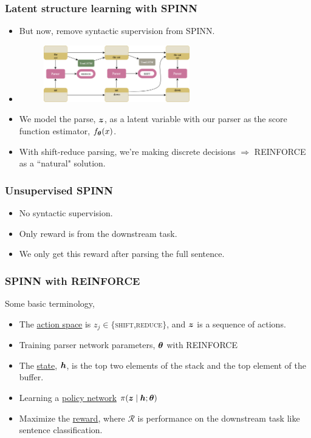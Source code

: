 \begin{frame}
\frametitle{Latent structure learning with SPINN}

\begin{itemize}
\item<2-> But now, remove syntactic supervision from SPINN.
\item[] \begin{figure}
\centering
\includegraphics[width=0.6\textwidth]{img/spinnLatentTutorial.png}
\end{figure}
\item<3-> We model the parse, $\boldsymbol{z}$, as a latent variable with our parser
as the score function estimator, $f_{\boldsymbol{\theta}}(x)$.
\item<4-> With shift-reduce parsing, we're making discrete decisions $\Rightarrow$ REINFORCE as a ``natural" solution.
\end{itemize}

\end{frame}




\begin{frame}
\frametitle{Unsupervised SPINN}
\begin{itemize}
	\item[] No syntactic supervision.
	\item[] Only reward is from the downstream task.
	\item[] We only get this reward after parsing the full sentence.
\end{itemize}
\end{frame}

\begin{frame}
\frametitle{SPINN with REINFORCE}
{}

Some basic terminology,
\begin{itemize}
\item The \underline{action space} is $z_j\in \{${\rmfamily\scshape{shift}},{\rmfamily\scshape{reduce}}$\}$, and $\boldsymbol{z}$ is a sequence of actions.
\item<2-> Training parser network parameters, $\boldsymbol{\theta}$ with REINFORCE
\item<3-> The \underline{state}, $\boldsymbol{h}$, is the top two elements of the stack and the top element of the buffer.
\item<4-> Learning a \underline{policy network} $\pi(\boldsymbol{z} \mid \boldsymbol{h}; \boldsymbol{\theta})$
\item<5-> Maximize the \underline{reward}, where $\mathcal{R}$ is performance on the downstream task like sentence classification.
\end{itemize}


\end{frame}


